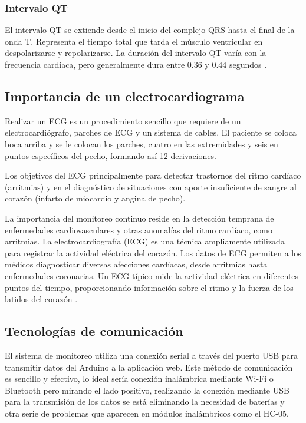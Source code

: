 \subsubsection{Intervalo QT}
El intervalo QT se extiende desde el inicio del complejo QRS hasta el final de la onda T. Representa el tiempo total que tarda el músculo ventricular en despolarizarse y repolarizarse. La duración del intervalo QT varía con la frecuencia cardíaca, pero generalmente dura entre 0.36 y 0.44 segundos \cite{azcona2009electrocardiograma}.

\subsection{Importancia de un electrocardiograma}

Realizar un ECG es un procedimiento sencillo que requiere de un electrocardiógrafo, parches de ECG y un sistema de cables. El paciente se coloca boca arriba y se le colocan los parches, cuatro en las extremidades y seis en puntos específicos del pecho, formando así 12 derivaciones.

Los objetivos del ECG principalmente para detectar trastornos del ritmo cardíaco (arritmias) y en el diagnóstico de situaciones con aporte insuficiente de sangre al corazón (infarto de miocardio y angina de pecho).

La importancia del monitoreo continuo reside en la detección temprana de enfermedades cardiovasculares y otras anomalías del ritmo cardíaco, como arritmias. La electrocardiografía (ECG) es una técnica ampliamente utilizada para registrar la actividad eléctrica del corazón. Los datos de ECG permiten a los médicos diagnosticar diversas afecciones cardíacas, desde arritmias hasta enfermedades coronarias. Un ECG típico mide la actividad eléctrica en diferentes puntos del tiempo, proporcionando información sobre el ritmo y la fuerza de los latidos del corazón \cite{MayoClinic_monitoring}.

\subsection{Tecnologías de comunicación}

El sistema de monitoreo utiliza una conexión serial a través del puerto USB para transmitir datos del Arduino a la aplicación web. Este método de comunicación es sencillo y efectivo, lo ideal sería conexión inalámbrica mediante Wi-Fi o Bluetooth pero mirando el lado positivo, realizando la conexión mediante USB para la transmisión de los datos se está eliminando la necesidad de baterías y otra serie de problemas que aparecen en módulos inalámbricos como el HC-05.

